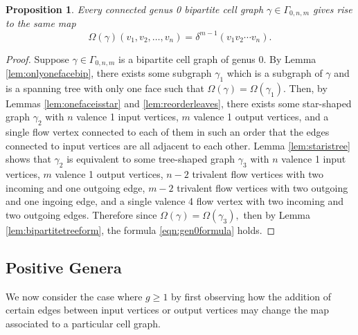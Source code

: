 \documentclass{amsart}
\newcommand{\be}{\begin{equation}}
\newcommand{\ee}{\end{equation}}
\newtheorem{Prop}[Lem]{Proposition}
\theoremstyle{definition}
\begin{document}
\begin{Prop}\label{prop:bipartitegen0}
    Every connected genus 0 bipartite cell graph $\gamma\in\Gamma_{0,n,m}$ gives rise to the same map
    \be\label{eqn:gen0formula}
    \Omega(\gamma)(v_1,v_2,\ldots,v_n)=\delta^{m-1}(v_1 v_2\cdots v_n).
    \ee
\end{Prop}
\begin{proof}
    Suppose $\gamma\in\Gamma_{0,n,m}$ is a bipartite cell graph of genus 0. By Lemma \ref{lem:onlyonefacebip}, there exists some subgraph $\gamma_1$ which is a subgraph of $\gamma$ and is a spanning tree with only one face such that $\Omega(\gamma)=\Omega(\gamma_1)$. Then, by Lemmas \ref{lem:onefaceisstar} and \ref{lem:reorderleaves}, there exists some star-shaped graph $\gamma_2$ with $n$ valence 1 input vertices, $m$ valence 1 output vertices, and a single flow vertex connected to each of them in such an order that the edges connected to input vertices are all adjacent to each other. Lemma \ref{lem:staristree} shows that $\gamma_2$ is equivalent to some tree-shaped graph $\gamma_3$ with $n$ valence 1 input vertices, $m$ valence 1 output vertices, $n-2$ trivalent flow vertices with two incoming and one outgoing edge, $m-2$ trivalent flow vertices with two outgoing and one ingoing edge, and a single valence 4 flow vertex with two incoming and two outgoing edges. Therefore since $\Omega(\gamma)=\Omega(\gamma_3),$ then by Lemma \ref{lem:bipartitetreeform}, the formula \ref{eqn:gen0formula} holds.
    
\end{proof}

\subsection{Positive Genera}
\noindent We now consider the case where $g\geq 1$ by first observing how the addition of certain edges between input vertices or output vertices may change the map associated to a particular cell graph.
\end{document}
